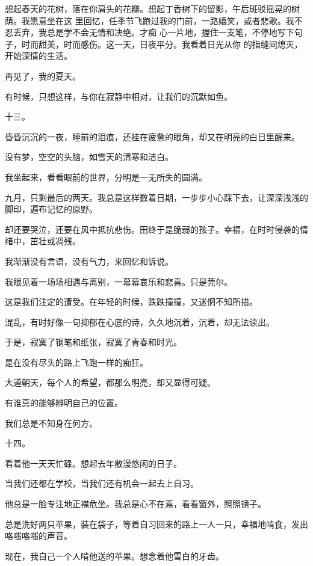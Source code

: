 \documentclass[12pt,a4paper]{article}
\def\blankrev{\vspace{1ex}}									%
\newcommand{\subpart}[1]{
	\begingroup \par
	\vspace{1ex} \centering #1
	\par \endgroup \nopagebreak[4]
}
\begin{document}
		想起春天的花树，落在你肩头的花瓣。想起丁香树下的留影，午后斑驳摇晃的树荫。我愿意坐在这
	里回忆，任季节飞跑过我的门前，一路嬉笑，或者悲歌。我不忍丢弃，我总是学不会无情和决绝。才痴
	心一片地，握住一支笔，不停地写下句子，时而甜美，时而感伤。这一天，日夜平分。我看着日光从你
	的指缝间熄灭，开始深情的生活。

		再见了，我的夏天。

	\endwriting



		有时候，只想这样，与你在寂静中相对，让我们的沉默如鱼。

		\subpart{十三。}

		昏昏沉沉的一夜，睡前的泪痕，还挂在疲惫的眼角，却又在明亮的白日里醒来。\par
		没有梦，空空的头脑，如雪天的清寒和洁白。\par
		我坐起来，看看眼前的世界，分明是一无所失的圆满。\par
		九月，只剩最后的两天。我总是这样数着日期，一步步小心踩下去，让深深浅浅的脚印，遍布记忆的原野。\par
		却还要哭泣，还要在风中抵抗悲伤。田终于是脆弱的孩子。幸福，在时时侵袭的情绪中，茁壮或凋残。\par
		我渐渐没有言语，没有气力，来回忆和诉说。\par
		我眼见着一场场相遇与离别，一幕幕哀乐和悲喜。只是莞尔。

		\blankrev
		这是我们注定的遭受。在年轻的时候，跌跌撞撞，又迷惘不知所措。\par
		混乱，有时好像一句抑郁在心底的诗，久久地沉着，沉着，却无法读出。\par
		于是，寂寞了钢笔和纸张，寂寞了青春和时光。\par
		是在没有尽头的路上飞跑一样的痴狂。\par
		大道朝天，每个人的希望，都那么明亮，却又显得可疑。\par
		有谁真的能够辨明自己的位置。\par
		我们总是不知身在何方。


		\subpart{十四。}

		看着他一天天忙碌。想起去年散漫悠闲的日子。\par
		当我们还都在学校，当我们还有机会一起去上自习。\par
		他总是一脸专注地正襟危坐。我总是心不在焉，看看窗外，照照镜子。\par
		总是洗好两只苹果，装在袋子，等着自习回来的路上一人一只，幸福地啃食，发出咯嗤咯嗤的声音。\par
		现在，我自己一个人啃他送的苹果。想念着他雪白的牙齿。
\end{document}
